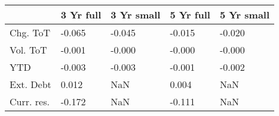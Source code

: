 \begin{tabular}{lllll}
\toprule
{} & 3 Yr full & 3 Yr small & 5 Yr full & 5 Yr small \\
\midrule
Chg. ToT   &    -0.065 &     -0.045 &    -0.015 &     -0.020 \\
Vol. ToT   &    -0.001 &     -0.000 &    -0.000 &     -0.000 \\
YTD        &    -0.003 &     -0.003 &    -0.001 &     -0.002 \\
Ext. Debt  &     0.012 &        NaN &     0.004 &        NaN \\
Curr. res. &    -0.172 &        NaN &    -0.111 &        NaN \\
\bottomrule
\end{tabular}
